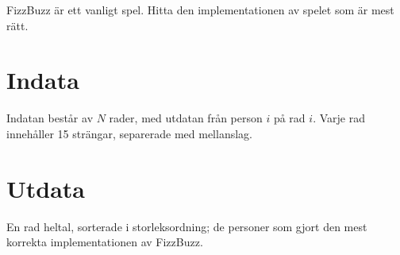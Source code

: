 FizzBuzz är ett vanligt spel. Hitta den implementationen av spelet som är mest rätt. 

\section*{Indata}
Indatan består av $N$ rader, med utdatan från person $i$ på rad $i$. Varje rad innehåller 15 strängar, separerade med mellanslag.

\section*{Utdata}
En rad heltal, sorterade i storleksordning; de personer som gjort den mest korrekta implementationen av FizzBuzz.


